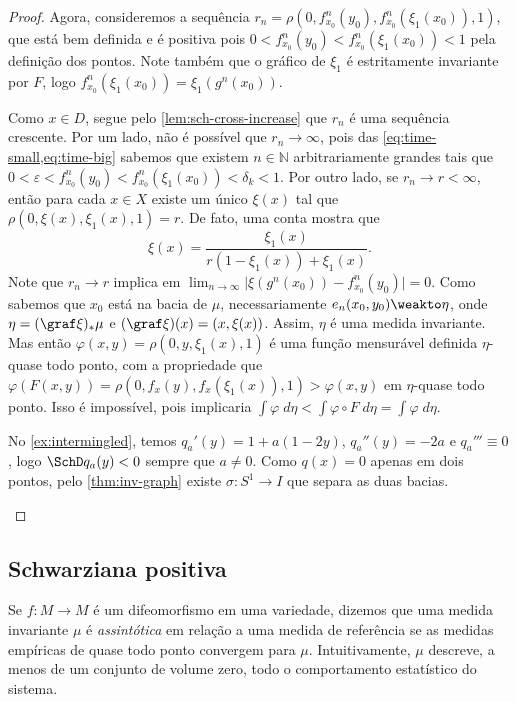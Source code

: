 \documentclass[../fapesp0]{subfiles}
\begin{document}
\begin{proof}
  Agora, consideremos a sequência \(r_n = \rho(0, f_{x_0}^n(y_0), f_{x_0}^n(\xi_1(x_0)), 1)\), que está bem definida e é positiva pois \(0< f_{x_0}^n(y_0)<f_{x_0}^n(\xi_1(x_0))< 1\) pela definição dos pontos. Note também que o gráfico de \(\xi_1\) é estritamente invariante por \(F\), logo \(f_{x_0}^n(\xi_1(x_0)) = \xi_1(g^n(x_0))\).

  Como \(x \in D\), segue pelo \cref{lem:sch-cross-increase} que \(r_n\) é uma sequência crescente. Por um lado, não é possível que \(r_n \to \infty\), pois das \cref{eq:time-small,eq:time-big} sabemos que existem \(n \in \mathbb{N}\) arbitrariamente grandes tais que \(0 < \varepsilon < f^n_{x_0}(y_0) < f^n_{x_0}(\xi_1(x_0)) < \delta_k < 1\). Por outro lado, se \(r_n \to r < \infty\), então para cada \(x \in X\) existe um único \(\xi(x)\) tal que \(\rho(0,\xi(x),\xi_1(x),1) = r\). De fato, uma conta mostra que
  \begin{equation*}
    \xi(x) = \frac{\xi_1(x)}{r(1 - \xi_1(x)) + \xi_1(x)}.
  \end{equation*}
  Note que \(r_n \to r\) implica em \(\lim_{n \to \infty} \lvert \xi(g^n(x_0)) - f_{x_0}^n(y_0) \rvert = 0\). Como sabemos que \(x_0\) está na bacia de \(\mu\), necessariamente \(e_n(x_0,y_0)\weakto \eta\), onde \(\eta = (\graf \xi)_* \mu\) e \((\graf \xi)(x) = (x,\xi(x))\). Assim, \(\eta\) é uma medida invariante. Mas então \(\varphi(x,y) = \rho(0, y, \xi_1(x), 1)\) é uma função mensurável definida \(\eta\)-quase todo ponto, com a propriedade que \(\varphi(F(x,y)) = \rho(0, f_x(y), f_x(\xi_1(x)), 1) > \varphi(x,y)\) em \(\eta\)-quase todo ponto. Isso é impossível, pois implicaria \(\int \varphi \;d \eta < \int \varphi \circ F \;d\eta = \int \varphi \;d\eta\).

  \begin{example}
    No \cref{ex:intermingled}, temos \(q_a'(y) = 1 + a(1 - 2y)\), \(q_a''(y) = -2a\) e \(q_a''' \equiv 0\), logo \(\SchD q_a(y) < 0\) sempre que \(a \neq 0\). Como \(q(x) = 0\) apenas em dois pontos, pelo \cref{thm:inv-graph} existe \(\sigma \colon S^1 \to I\) que separa as duas bacias.
  \end{example}
  
\end{proof}

\subsection{Schwarziana positiva}

Se \(f \colon M \to M\) é um difeomorfismo em uma variedade, dizemos que uma medida invariante \(\mu\) é \emph{assintótica} em relação a uma medida de referência se as medidas empíricas de quase todo ponto convergem para \(\mu\). Intuitivamente, \(\mu\) descreve, a menos de um conjunto de volume zero, todo o comportamento estatístico do sistema.
\end{document}
